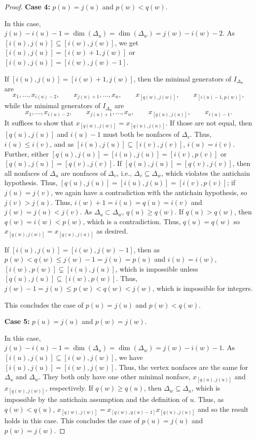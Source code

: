 \begin{proof}
    \medskip
    
    \noindent\textbf{Case 4:} $p(u)=j(u)$ and $p(w)<q(w)$.

    \medskip
    
    In this case, $j(u)-i(u)-1 = \dim(\Delta_u) = \dim(\Delta_w) = j(w)-i(w)-2$.
    As \newline $[i(u),j(u)]\subseteq [i(w),j(w)]$, we get $[i(u),j(u)]= [i(w)+1,j(w)]$ or $[i(u),j(u)]= [i(w),j(w)-1]$.
    
    
    If $[i(u),j(u)]= [i(w)+1,j(w)]$, then the minimal generators of $I_{\Delta_w}$ are
    \[x_1,\dots,x_{i(u)-2},\qquad x_{j(u)+1},\dots,x_n,\qquad x_{[q(w),j(w)]},\qquad x_{[i(u)-1,p(w)]},\]
    while the minimal generators of $I_{\Delta_u}$ are 
    \[x_1,\dots,x_{i(u)-2},\qquad x_{j(u)+1},\dots,x_n,\qquad x_{[q(u),j(u)]},\qquad x_{i(u)-1}.\]
    It suffices to show that $x_{[q(w),j(w)]} = x_{[q(u),j(u)]}$.
    If those are not equal, then $[q(u),j(u)]$ and $i(u)-1$ must both be nonfaces of $\Delta_v$.
    Thus, $i(u)\leq i(v)$, and as $[i(u),j(u)]\subseteq [i(v),j(v)]$, $i(u)= i(v)$.
    Further, either $[q(u),j(u)] = [i(u),j(u)] = [i(v),p(v)]$ or $[q(u),j(u)] = [q(v),j(v)]$.
    If $[q(u),j(u)] = [q(v),j(v)]$, then all nonfaces of $\Delta_u$ are nonfaces of $\Delta_v$, i.e., $\Delta_v\subseteq \Delta_w$, which violates the antichain hypothesis.
    Thus, $[q(u),j(u)] = [i(u),j(u)] = [i(v),p(v)]$; if $j(u)=j(v)$, we again have a contradiction with the antichain hypothesis, so $j(v)>j(u)$.
    Thus, $i(w)+1=i(u)=q(u)=i(v)$ and $j(w) = j(u)<j(v)$.
    As $\Delta_u\subset \Delta_w$, $q(u)\geq q(w)$.
    If $q(u)>q(w)$, then $q(w)=i(w)< p(w)$, which is a contradiction.
    Thus, $q(u)=q(w)$ so $x_{[q(w),j(w)]}=x_{[q(u),j(u)]}$ as desired.

    If $[i(u),j(u)]= [i(w),j(w)-1]$, then as $p(w)<q(w)\leq j(w)-1 = j(u)=p(u)$ and $i(u)=i(w)$, $[i(w),p(w)]\subsetneq [i(u),j(u)]$, which is impossible unless $[q(u),j(u)]\subseteq [i(w),p(w)]$.
    Thus, $j(w)-1 = j(u)\leq p(w) <q(w) <j(w)$, which is impossible for integers.

    This concludes the case of $p(u)=j(u)$ and $p(w)<q(w)$.
    
    \medskip
    
    \noindent\textbf{Case 5:} $p(u)=j(u)$ and $p(w)=j(w)$. 

    \medskip
    
    In this case, $j(u)-i(u)-1 = \dim(\Delta_u) = \dim(\Delta_w) = j(w)-i(w)-1$.
    As $[i(u),j(u)] \subseteq [i(w),j(w)]$, we have $[i(u),j(u)] = [i(w),j(w)]$.
    Thus, the vertex nonfaces are the same for $\Delta_u$ and $\Delta_w$.
    They both only have one other minimal nonface, $x_{[q(u),j(u)]}$ and $x_{[q(w),j(w)]}$, respectively.
    If $q(w)\geq q(u)$, then $\Delta_w\subseteq \Delta_u$, which is impossible by the antichain assumption and the definition of $u$.
    Thus, as $q(w)<q(u)$, $x_{[q(w),j(w)]} = x_{[q(w),q(u)-1]}x_{[q(u),j(u)]}$ and so the result holds in this case.
    This concludes the case of $p(u)=j(u)$ and $p(w)=j(w)$.


\end{proof}
